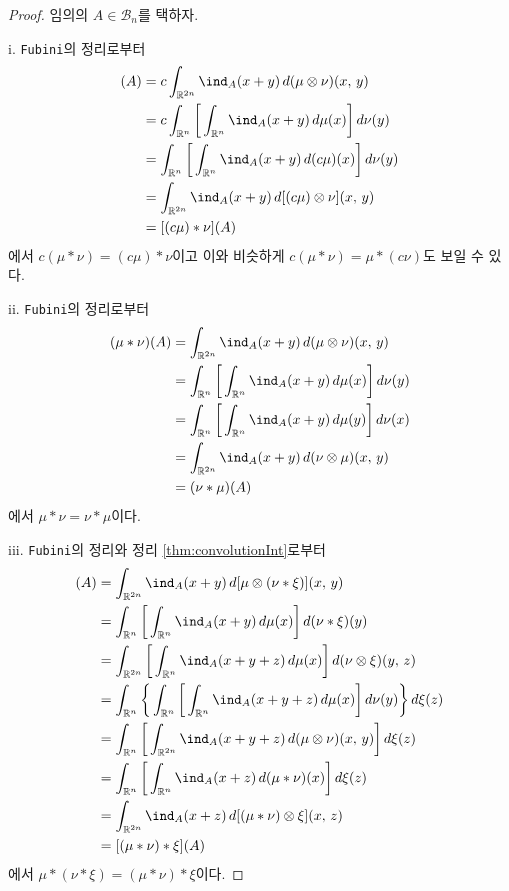 \begin{proof}
    임의의 $A\in\mathcal{B}_n$를 택하자.

    i. \texttt{Fubini}의 정리로부터
    \begin{align*}
        [c(\mu*\nu)](A)&=c\int_{\mathbb{R}^{2n}}\ind_A(x+y)\,d(\mu\otimes\nu)(x,\,y)\\
        &=c\int_{\mathbb{R}^n}\bigg[\int_{\mathbb{R}^n}\ind_A(x+y)\,d\mu(x)\bigg]\,d\nu(y)\\
        &=\int_{\mathbb{R}^n}\bigg[\int_{\mathbb{R}^n}\ind_A(x+y)\,d(c\mu)(x)\bigg]\,d\nu(y)\\
        &=\int_{\mathbb{R}^{2n}}\ind_A(x+y)\,d[(c\mu)\otimes\nu](x,\,y)\\
        &=[(c\mu)*\nu](A)
    \end{align*}
    에서 $c(\mu*\nu)=(c\mu)*\nu$이고 이와 비슷하게 $c(\mu*\nu)=\mu*(c\nu)$도 보일 수 있다.

    ii. \texttt{Fubini}의 정리로부터
    \begin{align*}
        (\mu*\nu)(A)&=\int_{\mathbb{R}^{2n}}\ind_A(x+y)\,d(\mu\otimes\nu)(x,\,y)\\
        &=\int_{\mathbb{R}^n}\bigg[\int_{\mathbb{R}^n}\ind_A(x+y)\,d\mu(x)\bigg]\,d\nu(y)\\
        &=\int_{\mathbb{R}^n}\bigg[\int_{\mathbb{R}^n}\ind_A(x+y)\,d\mu(y)\bigg]\,d\nu(x)\\
        &=\int_{\mathbb{R}^{2n}}\ind_A(x+y)\,d(\nu\otimes\mu)(x,\,y)\\
        &=(\nu*\mu)(A)
    \end{align*}
    에서 $\mu*\nu=\nu*\mu$이다.

    iii. \texttt{Fubini}의 정리와 정리 \ref{thm:convolutionInt}로부터
    \begin{align*}
        [\mu*(\nu*\xi)](A)&=\int_{\mathbb{R}^{2n}}\ind_A(x+y)\,d[\mu\otimes(\nu*\xi)](x,\,y)\\
        &=\int_{\mathbb{R}^n}\bigg[\int_{\mathbb{R}^n}\ind_A(x+y)\,d\mu(x)\bigg]\,d(\nu*\xi)(y)\\
        &=\int_{\mathbb{R}^{2n}}\bigg[\int_{\mathbb{R}^n}\ind_A(x+y+z)\,d\mu(x)\bigg]\,d(\nu\otimes\xi)(y,\,z)\\
        &=\int_{\mathbb{R}^n}\bigg\{\int_{\mathbb{R}^n}\bigg[\int_{\mathbb{R}^n}\ind_A(x+y+z)\,d\mu(x)\bigg]\,d\nu(y)\bigg\}\,d\xi(z)\\
        &=\int_{\mathbb{R}^n}\bigg[\int_{\mathbb{R}^{2n}}\ind_A(x+y+z)\,d(\mu\otimes\nu)(x,\,y)\bigg]\,d\xi(z)\\
        &=\int_{\mathbb{R}^n}\bigg[\int_{\mathbb{R}^n}\ind_A(x+z)\,d(\mu*\nu)(x)\bigg]\,d\xi(z)\\
        &=\int_{\mathbb{R}^{2n}}\ind_A(x+z)\,d[(\mu*\nu)\otimes\xi](x,\,z)\\
        &=[(\mu*\nu)*\xi](A)
    \end{align*}
    에서 $\mu*(\nu*\xi)=(\mu*\nu)*\xi$이다.


\end{proof}
